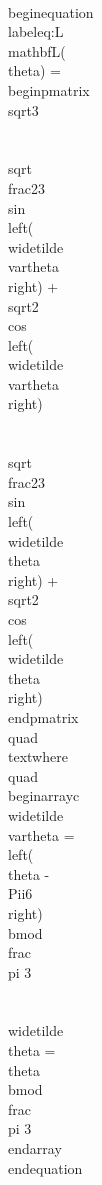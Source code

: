 \\begin{equation}\\label{eq:L}
\\mathbf{L}(\\theta) =
\\begin{pmatrix}
\\sqrt{3} \\\\
 \\sqrt{\\frac{2}{3}} \\sin \\left(\\widetilde{\\vartheta}\\right) + \\sqrt{2} \\cos \\left(\\widetilde{\\vartheta}\\right) \\\\  
\\sqrt{\\frac{2}{3}} \\sin \\left(\\widetilde{\\theta}\\right) + \\sqrt{2} \\cos \\left(\\widetilde{\\theta}\\right) 
\\end{pmatrix}
\\quad \\text{where}  \\quad 
\\begin{array}{c}
\\widetilde{\\vartheta} = \\left(\\theta - \\Pii{6}\\right) \\bmod \\frac{\\pi }{3} \\\\
\\widetilde{\\theta} = \\theta  \\bmod \\frac{\\pi }{3} 
\\end{array}
\\end{equation}

